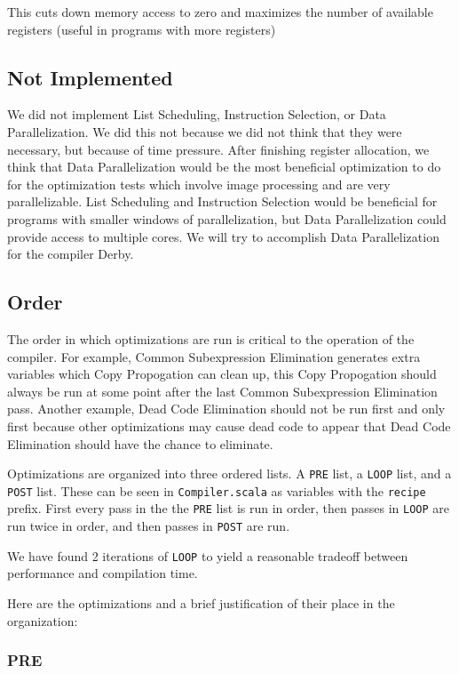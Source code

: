 \documentclass[11pt]{article}
\begin{document}
  This cuts down memory access to zero and maximizes the number of available registers (useful in programs with more registers)


\subsection{Not Implemented}
\label{sec-2.10}


  We did not implement List Scheduling, Instruction Selection, or Data Parallelization.
  We did this not because we did not think that they were necessary, but because of time pressure.
  After finishing register allocation, we think that Data Parallelization would be the most beneficial
  optimization to do for the optimization tests which involve image processing and are very parallelizable.
  List Scheduling and Instruction Selection would be beneficial for programs with smaller windows of parallelization,
  but Data Parallelization could provide access to multiple cores. We will try to accomplish Data Parallelization
  for the compiler Derby.

\subsection{Order}
\label{sec-2.11}


  The order in which optimizations are run is critical to the operation of the compiler.
  For example, Common Subexpression Elimination generates extra variables which Copy Propogation can clean up,
  this Copy Propogation should always be run at some point after the last Common Subexpression Elimination pass.
  Another example, Dead Code Elimination should not be run first and only first because other optimizations may
  cause dead code to appear that Dead Code Elimination should have the chance to eliminate.

  Optimizations are organized into three ordered lists. A \texttt{PRE} list, a \texttt{LOOP} list, and a \texttt{POST} list.
  These can be seen in \texttt{Compiler.scala} as variables with the \texttt{recipe} prefix. First every pass
  in the the \texttt{PRE} list is run in order, then passes in \texttt{LOOP} are run twice in order, and then passes in \texttt{POST} are run.

  We have found 2 iterations of \texttt{LOOP} to yield a reasonable tradeoff between performance and compilation time.

  Here are the optimizations and a brief justification of their place in the organization:
\subsubsection{PRE}
\label{sec-2.11.1}
\end{document}
